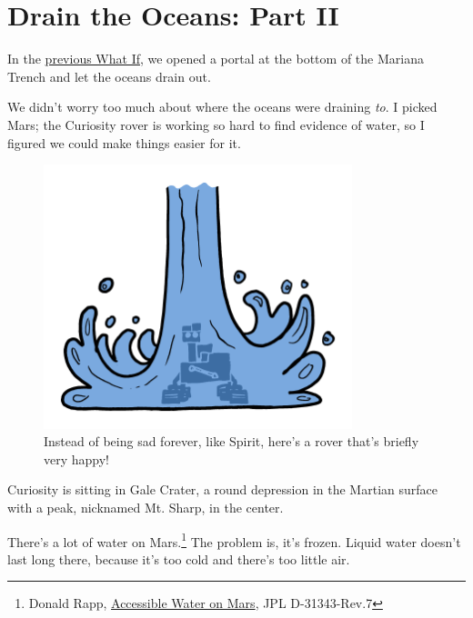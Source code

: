 {{
\chapter{Drain the Oceans: Part II}
}

\hfill{}

{In the \href{http://what-if.xkcd.com/53/}{previous What If}, we opened a portal at the bottom of the Mariana Trench and let the oceans drain out.}

{We didn't worry too much about where the oceans were draining \emph{to}. I picked Mars; the Curiosity rover is working so hard to find evidence of water, so I figured we could make things easier for it.}

\begin{figure}[!htbp]
\centering
\includegraphics[scale=0.5, max width=0.8\textwidth]{imgs/a/54/mars_curiosity.png}
\caption{Instead of being sad forever, like Spirit, here's a rover that's briefly very happy!}
\end{figure}

{Curiosity is sitting in Gale Crater, a round depression in the Martian surface with a peak, nicknamed Mt. Sharp, in the center.}

{There's a lot of water on Mars.{\footnote{Donald Rapp, \href{http://spaceclimate.net/Mars.Water.7.06R.pdf}{Accessible Water on Mars}, JPL D-31343-Rev.7} } The problem is, it's frozen. Liquid water doesn't last long there, because it's too cold and there's too little air.}

}
